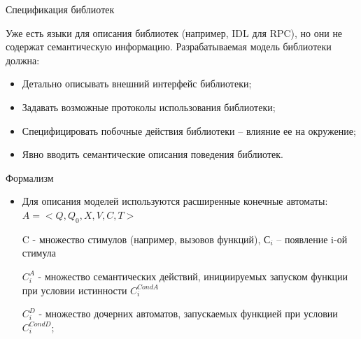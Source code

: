 \documentclass[12pt]{beamer}
\begin{document}
{
\begin{frame}{Спецификация библиотек}
\begin{mybox}[]
	Уже есть языки для описания библиотек (например, IDL для RPC), но они не содержат семантическую информацию.
	Разрабатываемая модель библиотеки должна:
\begin{itemize}
	\item Детально описывать внешний интерфейс библиотеки;
	\item Задавать возможные протоколы использования библиотеки;
	\item Специфицировать побочные действия библиотеки – влияние ее на окружение;
	\item Явно вводить семантические описания поведения библиотек.
\end{itemize}
\end{mybox}
\end{frame}
}

\begin{frame}[fragile]{Формализм}
  \begin{mybox}[]
  \begin{itemize}
  	\item Для описания моделей используются расширенные конечные автоматы:
  	$A = <Q, Q_0, X, V, C, T>$
  	
  	C - множество стимулов (например, вызовов функций), $С_i$ – появление i-ой стимула
  	
  	$C_i^A$ - множество семантических действий, инициируемых запуском функции при условии истинности $C_i^{CondA}$
  	
  	$C_i^D$ - множество дочерних автоматов, запускаемых функцией при условии $C_i^{CondD}$;
  \end{itemize}
  \end{mybox}
\end{frame}
\end{document}
